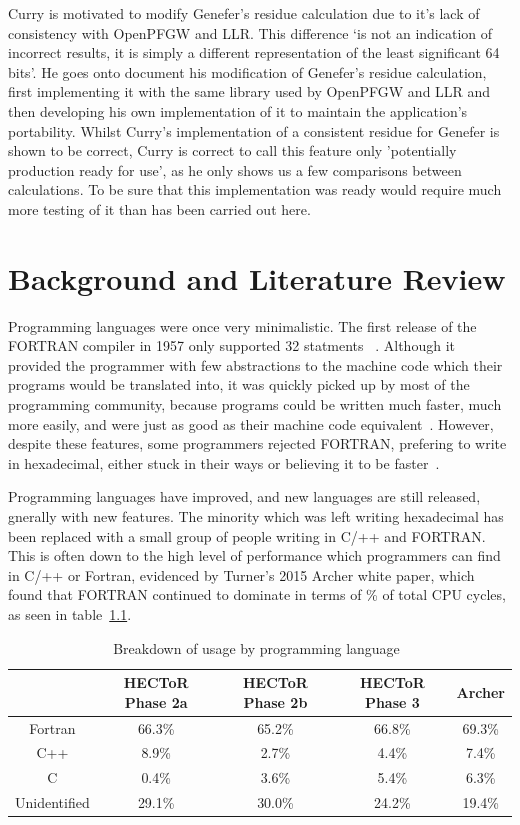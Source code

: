 \documentclass{report}
\begin{document}
Curry is motivated to modify Genefer's residue calculation due to it's lack of consistency with OpenPFGW and LLR. This difference `is not an indication of incorrect results, it is simply a different representation of the least significant 64 bits'. He goes onto document his modification of Genefer's residue calculation, first implementing it with the same library used by OpenPFGW and LLR and then developing his own implementation of it to maintain the application's portability. Whilst Curry's implementation of a consistent residue for Genefer is shown to be correct, Curry is correct to call this feature only 'potentially production ready for use', as he only shows us a few comparisons between calculations. To be sure that this implementation was ready would require much more testing of it than has been carried out here.



\chapter{Background and Literature Review} %
Programming languages were once very minimalistic. The first release of the FORTRAN compiler in 1957 only supported 32 statments~\cite{Backus:1957:FAC:1455567.1455599} . Although it provided the programmer with few abstractions to the machine code which their programs would be translated into, it was quickly picked up by most of the programming community, because programs could be written much faster, much more easily, and were just as good as their machine code equivalent~\cite{metcalf2011seven}. However, despite these features, some programmers rejected FORTRAN, prefering to write in hexadecimal, either stuck in their ways or believing it to be faster~\cite{Jargon}.

Programming languages have improved, and new languages are still released, gnerally with new features. The minority which was left writing hexadecimal has been replaced with a small group of people writing in C/++ and FORTRAN. This is often down to the high level of performance which programmers can find in C/++ or Fortran, evidenced by Turner's 2015 Archer white paper, which found that FORTRAN continued to dominate in terms of \% of total CPU cycles, as seen in table~\ref{tab:langs}.
\begin{table}[h]
  \centering
  \label{tab:langs}
  \begin{tabular}{|c|c|c|c|c|}
    \hline
    & \textbf{HECToR Phase 2a} & \textbf{HECToR Phase 2b} & \textbf{HECToR Phase 3} & \textbf{Archer} \\
    \hline
    Fortran & 66.3\% & 65.2\% & 66.8\% & 69.3\% \\
    \hline
    C++ & 8.9\% & 2.7\% & 4.4\% & 7.4\% \\
    \hline
    C & 0.4\% & 3.6\% & 5.4\% & 6.3\% \\
    \hline
    Unidentified & 29.1\% &  30.0\% & 24.2\% & 19.4\% \\
    \hline
  \end{tabular}
  \caption{Breakdown of usage by programming language~\cite{Turner2015}}
\end{table}
\end{document}
